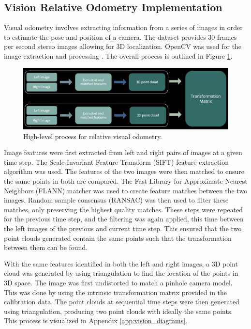 \documentclass[bare_jrnl_transmag]{subfiles}
\begin{document}
\subsection{Vision Relative Odometry Implementation}

Visual odometry involves extracting information from a series of images in order to estimate the pose and position of a camera. The dataset provides 30 frames per second stereo images allowing for 3D localization. OpenCV was used for the image extraction and processing \cite{opencv}. The overall process is outlined in Figure \ref{fig:vio_process}.

\begin{figure}[H]
    \centering
    \includegraphics[width=1\linewidth]{figures/VIO_process.png}
    \caption{High-level process for relative visual odometry.}
    \label{fig:vio_process}
\end{figure}

Image features were first extracted from left and right pairs of images at a given time step. The Scale-Invariant Feature Transform (SIFT) feature extraction algorithm was used. The features of the two images were then matched to ensure the same points in both are compared. The Fast Library for Approximate Nearest Neighbors (FLANN) matcher was used to create feature matches between the two images.  Random sample consensus (RANSAC) was then used to filter these matches, only preserving the highest quality matches. These steps were repeated for the previous time step, and the filtering was again applied, this time between the left images of the previous and current time step. This ensured that the two point clouds generated contain the same points such that the transformation between them can be found. \newline

With the same features identified in both the left and right images, a 3D point cloud was generated by using triangulation to find the location of the points in 3D space. The image was first undistorted to match a pinhole camera model. This was done by using the intrinsic transformation matrix provided in the calibration data. The point clouds at sequential time steps were then generated using triangulation, producing two point clouds with ideally the same points. This process is visualized in Appendix \ref{app:vision_diagrams}. \newline
\end{document}
